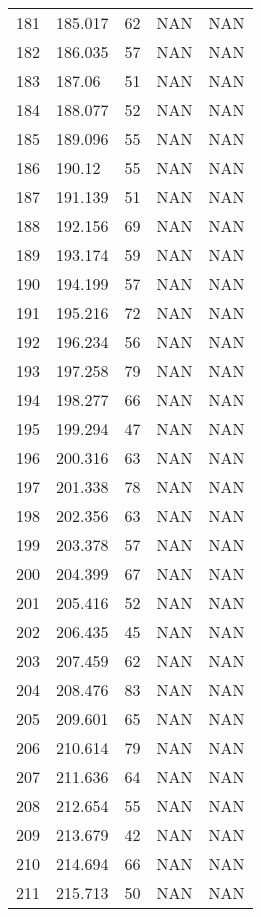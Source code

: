 \documentclass{article}
\begin{document}
\begin{longtable}{@{}lllll@{}}
				181 & 185.017 & 62    & NAN   & NAN   \\
				182 & 186.035 & 57    & NAN   & NAN   \\
				183 & 187.06  & 51    & NAN   & NAN   \\
				184 & 188.077 & 52    & NAN   & NAN   \\
				185 & 189.096 & 55    & NAN   & NAN   \\
				186 & 190.12  & 55    & NAN   & NAN   \\
				187 & 191.139 & 51    & NAN   & NAN   \\
				188 & 192.156 & 69    & NAN   & NAN   \\
				189 & 193.174 & 59    & NAN   & NAN   \\
				190 & 194.199 & 57    & NAN   & NAN   \\
				191 & 195.216 & 72    & NAN   & NAN   \\
				192 & 196.234 & 56    & NAN   & NAN   \\
				193 & 197.258 & 79    & NAN   & NAN   \\
				194 & 198.277 & 66    & NAN   & NAN   \\
				195 & 199.294 & 47    & NAN   & NAN   \\
				196 & 200.316 & 63    & NAN   & NAN   \\
				197 & 201.338 & 78    & NAN   & NAN   \\
				198 & 202.356 & 63    & NAN   & NAN   \\
				199 & 203.378 & 57    & NAN   & NAN   \\
				200 & 204.399 & 67    & NAN   & NAN   \\
				201 & 205.416 & 52    & NAN   & NAN   \\
				202 & 206.435 & 45    & NAN   & NAN   \\
				203 & 207.459 & 62    & NAN   & NAN   \\
				204 & 208.476 & 83    & NAN   & NAN   \\
				205 & 209.601 & 65    & NAN   & NAN   \\
				206 & 210.614 & 79    & NAN   & NAN   \\
				207 & 211.636 & 64    & NAN   & NAN   \\
				208 & 212.654 & 55    & NAN   & NAN   \\
				209 & 213.679 & 42    & NAN   & NAN   \\
				210 & 214.694 & 66    & NAN   & NAN   \\
				211 & 215.713 & 50    & NAN   & NAN   \\

\end{longtable}
\end{document}

